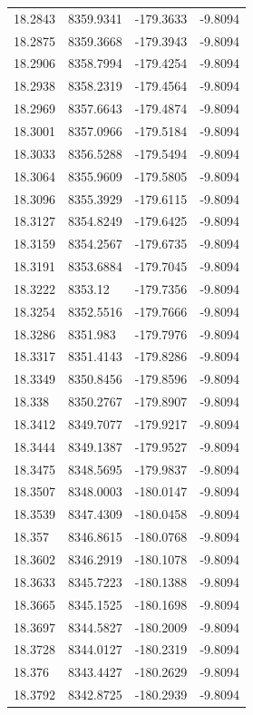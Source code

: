 \begin{table}[H]
\begin{tabular}{llll}
18.2843 & 8359.9341 & -179.3633 & -9.8094 \\
18.2875 & 8359.3668 & -179.3943 & -9.8094 \\
18.2906 & 8358.7994 & -179.4254 & -9.8094 \\
18.2938 & 8358.2319 & -179.4564 & -9.8094 \\
18.2969 & 8357.6643 & -179.4874 & -9.8094 \\
18.3001 & 8357.0966 & -179.5184 & -9.8094 \\
18.3033 & 8356.5288 & -179.5494 & -9.8094 \\
18.3064 & 8355.9609 & -179.5805 & -9.8094 \\
18.3096 & 8355.3929 & -179.6115 & -9.8094 \\
18.3127 & 8354.8249 & -179.6425 & -9.8094 \\
18.3159 & 8354.2567 & -179.6735 & -9.8094 \\
18.3191 & 8353.6884 & -179.7045 & -9.8094 \\
18.3222 & 8353.12 & -179.7356 & -9.8094 \\
18.3254 & 8352.5516 & -179.7666 & -9.8094 \\
18.3286 & 8351.983 & -179.7976 & -9.8094 \\
18.3317 & 8351.4143 & -179.8286 & -9.8094 \\
18.3349 & 8350.8456 & -179.8596 & -9.8094 \\
18.338 & 8350.2767 & -179.8907 & -9.8094 \\
18.3412 & 8349.7077 & -179.9217 & -9.8094 \\
18.3444 & 8349.1387 & -179.9527 & -9.8094 \\
18.3475 & 8348.5695 & -179.9837 & -9.8094 \\
18.3507 & 8348.0003 & -180.0147 & -9.8094 \\
18.3539 & 8347.4309 & -180.0458 & -9.8094 \\
18.357 & 8346.8615 & -180.0768 & -9.8094 \\
18.3602 & 8346.2919 & -180.1078 & -9.8094 \\
18.3633 & 8345.7223 & -180.1388 & -9.8094 \\
18.3665 & 8345.1525 & -180.1698 & -9.8094 \\
18.3697 & 8344.5827 & -180.2009 & -9.8094 \\
18.3728 & 8344.0127 & -180.2319 & -9.8094 \\
18.376 & 8343.4427 & -180.2629 & -9.8094 \\
18.3792 & 8342.8725 & -180.2939 & -9.8094 \\

\end{tabular}
\end{table}
